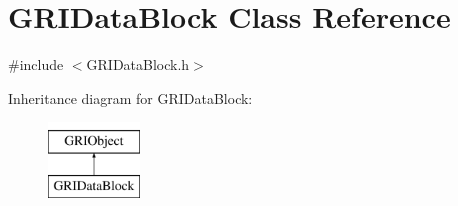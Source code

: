 \hypertarget{classGRIDataBlock}{\section{\-G\-R\-I\-Data\-Block \-Class \-Reference}
\label{classGRIDataBlock}
}


{\ttfamily \#include $<$\-G\-R\-I\-Data\-Block.\-h$>$}

\-Inheritance diagram for \-G\-R\-I\-Data\-Block\-:\begin{figure}[H]
\begin{center}
\leavevmode
\includegraphics[height=2.000000cm]{classGRIDataBlock}
\end{center}
\end{figure}
